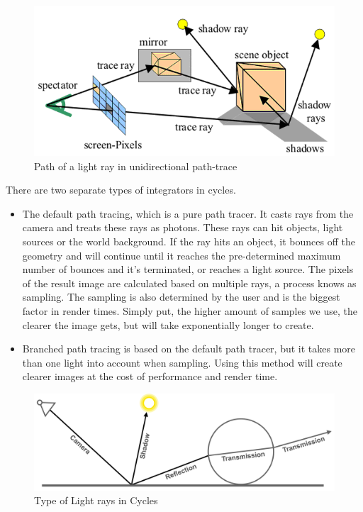 \documentclass[conference]{IEEEtran}
\begin{document}
\begin{figure}[htbp] %
\centerline{\includegraphics[scale=0.4]{Images/PathTracing.png}}
\caption{Path of a light ray in unidirectional path-trace}
\label{PathTracing}
\end{figure}

There are two separate types of integrators in cycles.
\begin{itemize}
    \item The default path tracing, which is a pure path tracer. It casts rays from the camera and treats these rays as photons. These rays can hit objects, light sources or the world background. If the ray hits an object, it bounces off the geometry and will continue until it reaches the pre-determined maximum number of bounces and it's terminated, or reaches a light source. The pixels of the result image are calculated based on multiple rays, a process knows as sampling. The sampling is also determined by the user and is the biggest factor in render times. Simply put, the higher amount of samples we use, the clearer the image gets, but will take exponentially longer to create.\\
    \item Branched path tracing is based on the default path tracer, but it takes more than one light into account when sampling. Using this method will create clearer images at the cost of performance and render time. \\
\end{itemize}

\begin{figure}[htbp]
\centerline{\includegraphics[scale=0.55]{Images/CyclesRayPath.png}}
\caption{Type of Light rays in Cycles}
\label{figlightRaysCycle}
\end{figure}
\end{document}
